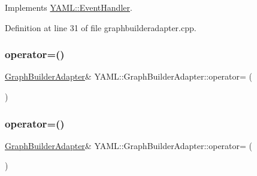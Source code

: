 Implements \mbox{\hyperlink{class_y_a_m_l_1_1_event_handler_adf7a5e4ccf638b656009525556412ab5}{Y\+A\+M\+L\+::\+Event\+Handler}}.



Definition at line 31 of file graphbuilderadapter.\+cpp.

\mbox{\label{class_y_a_m_l_1_1_graph_builder_adapter_ac9d68c3570b038036e6fc80e1da5aded}} 
\subsubsection{\texorpdfstring{operator=()}{operator=()}\hspace{0.1cm}{\footnotesize\ttfamily [1/2]}}
{\footnotesize\ttfamily \mbox{\hyperlink{class_y_a_m_l_1_1_graph_builder_adapter}{Graph\+Builder\+Adapter}}\& Y\+A\+M\+L\+::\+Graph\+Builder\+Adapter\+::operator= (\begin{DoxyParamCaption}\item[{const \mbox{\hyperlink{class_y_a_m_l_1_1_graph_builder_adapter}{Graph\+Builder\+Adapter}} \&}]{ }\end{DoxyParamCaption})\hspace{0.3cm}{\ttfamily [delete]}}

\mbox{\label{class_y_a_m_l_1_1_graph_builder_adapter_ae89b1f7cd4c08bf981ba61f85c9885a0}} 
\subsubsection{\texorpdfstring{operator=()}{operator=()}\hspace{0.1cm}{\footnotesize\ttfamily [2/2]}}
{\footnotesize\ttfamily \mbox{\hyperlink{class_y_a_m_l_1_1_graph_builder_adapter}{Graph\+Builder\+Adapter}}\& Y\+A\+M\+L\+::\+Graph\+Builder\+Adapter\+::operator= (\begin{DoxyParamCaption}\item[{\mbox{\hyperlink{class_y_a_m_l_1_1_graph_builder_adapter}{Graph\+Builder\+Adapter}} \&\&}]{ }\end{DoxyParamCaption})\hspace{0.3cm}{\ttfamily [delete]}}

